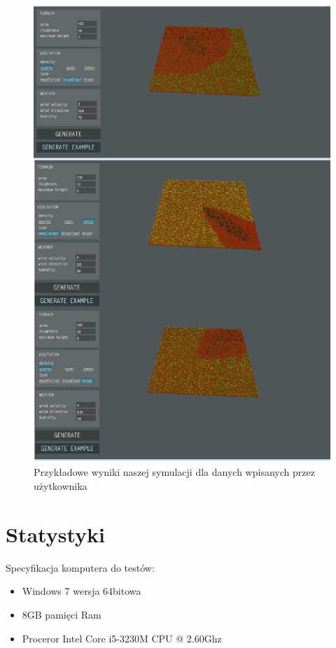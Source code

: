 \documentclass[a4paper, 11pt]{article}
\begin{document}
\begin{figure}[H]
		\centerline{\includegraphics[scale=0.4]{MJscreen4}}
		\raggedright{	\caption{Przykładowe wyniki naszej symulacji dla danych wpisanych przez użytkownika}}
	\end{figure}
	\section*{Statystyki}
	\indent
	Specyfikacja komputera do testów:\\
	\begin{itemize}
	\item Windows 7 wersja 64bitowa
	\item 8GB pamięci Ram
	\item Proceror Intel Core i5-3230M CPU @ 2.60Ghz
\end{itemize}		
	
\end{document}
